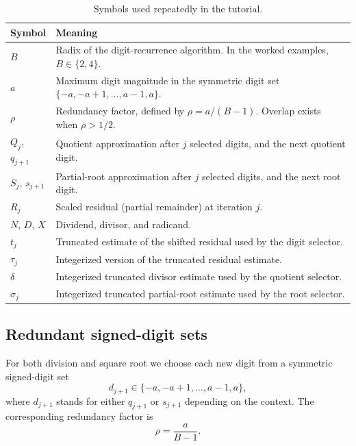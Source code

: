 \documentclass[11pt]{article}
\numberwithin{equation}{section}
\begin{document}
\begin{table}[htbp]
  \centering
  \caption{Symbols used repeatedly in the tutorial.}
  \label{tab:notation}
  \renewcommand{\arraystretch}{1.2}
  \begin{tabularx}{\textwidth}{l >{\raggedright\arraybackslash}X}
    \toprule
    Symbol & Meaning \\
    \midrule
    $B$ & Radix of the digit-recurrence algorithm. In the worked examples, $B \in \{2,4\}$. \\
    $a$ & Maximum digit magnitude in the symmetric digit set $\{-a,-a+1,\dotsc,a-1,a\}$. \\
    $\rho$ & Redundancy factor, defined by $\rho = a/(B-1)$. Overlap exists when $\rho > 1/2$. \\
    $Q_j$, $q_{j+1}$ & Quotient approximation after $j$ selected digits, and the next quotient digit. \\
    $S_j$, $s_{j+1}$ & Partial-root approximation after $j$ selected digits, and the next root digit. \\
    $R_j$ & Scaled residual (partial remainder) at iteration $j$. \\
    $N$, $D$, $X$ & Dividend, divisor, and radicand. \\
    $t_j$ & Truncated estimate of the shifted residual used by the digit selector. \\
    $\tau_j$ & Integerized version of the truncated residual estimate. \\
    $\delta$ & Integerized truncated divisor estimate used by the quotient selector. \\
    $\sigma_j$ & Integerized truncated partial-root estimate used by the root selector. \\
    \bottomrule
  \end{tabularx}
\end{table}

\subsection{Redundant signed-digit sets}
\label{ssec:preliminaries:redundancy}

For both division and square root we choose each new digit from a symmetric signed-digit set
\begin{equation}
  \label{eq:preliminaries:digit_set}
  d_{j+1} \in \{-a,-a+1,\dotsc,a-1,a\},
\end{equation}
where $d_{j+1}$ stands for either $q_{j+1}$ or $s_{j+1}$ depending on the context.
The corresponding redundancy factor is
\begin{equation}
  \label{eq:preliminaries:rho_def}
  \rho = \frac{a}{B-1}.
\end{equation}
\end{document}
